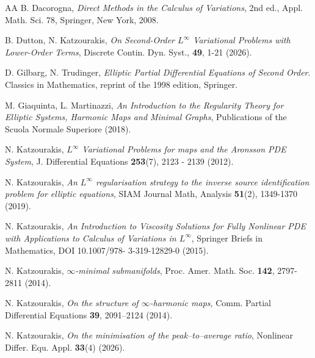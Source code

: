 \documentclass[a4paper,11pt]{article}
\numberwithin{equation}{section}
\theoremstyle{definition}
\begin{document}
\begin{thebibliography}{AA}
B. Dacorogna, {\it Direct Methods in the Calculus of Variations}, 2nd ed., Appl. Math. Sci. 78, Springer, New York, 2008.


B. Dutton, N. Katzourakis, {\it On Second-Order $L^\infty$ Variational Problems with Lower-Order Terms}, Discrete Contin. Dyn. Syst., {\bf 49}, 1-21 (2026).

D. Gilbarg, N. Trudinger, {\it Elliptic Partial Differential Equations of Second Order}.
Classics in Mathematics, reprint of the 1998 edition, Springer.



M. Giaquinta, L. Martinazzi, {\it An Introduction to the Regularity Theory for Elliptic Systems,
Harmonic Maps and Minimal Graphs}, Publications of the Scuola Normale Superiore (2018).

N. Katzourakis, {\it $L^\infty$ Variational Problems for maps and the Aronsson PDE System}, J. Differential
Equations {\bf 253}(7), 2123 - 2139 (2012).

N. Katzourakis, {\it An $L^\infty$ regularisation strategy to the inverse source identification problem for elliptic equations}, SIAM Journal Math, Analysis {\bf 51}(2), 1349-1370 (2019).


N. Katzourakis, {\it An Introduction to Viscosity Solutions for Fully Nonlinear PDE with Applications
to Calculus of Variations in $L^\infty$}, Springer Briefs in Mathematics,  DOI 10.1007/978-
3-319-12829-0 (2015).

N. Katzourakis, {\it $\infty$-minimal submanifolds}, Proc. Amer. Math. Soc. {\bf 142}, 2797-2811 (2014).

N. Katzourakis, {\it On the structure of $\infty$-harmonic maps}, Comm. Partial Differential
Equations {\bf 39}, 2091–2124 (2014).

N. Katzourakis, {\it On the minimisation of the peak–to–average ratio}, Nonlinear Differ. Equ. Appl. {\bf 33}(4) (2026). 


\end{thebibliography}
\end{document}

